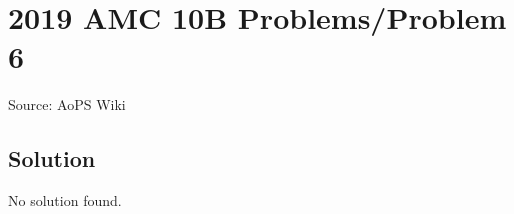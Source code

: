 \documentclass[12pt]{article}
\begin{document}
\section*{{2019 AMC 10B Problems/Problem 6}}
Source: AoPS Wiki

\subsection*{Solution}
No solution found.
\end{document}
